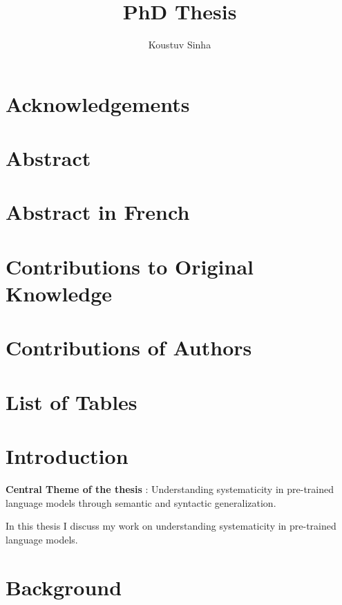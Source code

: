 \documentclass[letterpaper, 12pt]{report}
\author{Koustuv Sinha}
\date{}
\title{PhD Thesis}
\begin{document}
\maketitle
\raggedbottom
{}%
{}

\chapter*{Acknowledgements}
\label{sec:orgecdfd06}
\chapter*{Abstract}
\label{sec:org5f97da3}
\chapter*{Abstract in French}
\label{sec:org0716849}
\chapter*{Contributions to Original Knowledge}
\label{sec:orge1b928a}
\chapter*{Contributions of Authors}
\label{sec:org67e36a0}
\listoffigures{}

\chapter*{List of Tables}
\label{sec:orge4be181}
\clearpage
\setcounter{tocdepth}{3}
\tableofcontents

\clearpage

\chapter{Introduction}
\label{sec:org84b1781}
\textbf{\textbf{Central Theme of the thesis}} : Understanding systematicity in pre-trained language models through semantic and syntactic generalization.

In this thesis I discuss my work on understanding systematicity in pre-trained language models.

\clearpage
\chapter{Background}
\label{sec:orge973dec}
\end{document}
